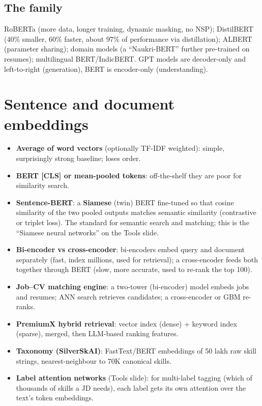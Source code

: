\subsection{The family}
RoBERTa (more data, longer training, dynamic masking, no NSP); DistilBERT (40\% smaller, 60\% faster, about 97\% of performance via distillation);
ALBERT (parameter sharing); domain models (a ``Naukri-BERT'' further pre-trained on resumes); multilingual BERT/IndicBERT. GPT models are decoder-only
and left-to-right (generation), BERT is encoder-only (understanding).

\section{Sentence and document embeddings}
\begin{itemize}
\item \textbf{Average of word vectors} (optionally TF-IDF weighted): simple, surprisingly strong baseline; loses order.
\item \textbf{BERT [CLS] or mean-pooled tokens}: off-the-shelf they are poor for similarity search.
\item \textbf{Sentence-BERT}: a \textbf{Siamese} (twin) BERT fine-tuned so that cosine similarity of the two pooled outputs matches semantic similarity
  (contrastive or triplet loss). The standard for semantic search and matching; this is the ``Siamese neural networks'' on the Tools slide.
\item \textbf{Bi-encoder vs cross-encoder}: bi-encoders embed query and document separately (fast, index millions, used for retrieval); a cross-encoder
  feeds both together through BERT (slow, more accurate, used to re-rank the top 100).
\end{itemize}

\begin{practical}
\begin{itemize}
\item \textbf{Job--CV matching engine}: a two-tower (bi-encoder) model embeds jobs and resumes; ANN search retrieves candidates; a cross-encoder or
  GBM re-ranks.
\item \textbf{PremiumX hybrid retrieval}: vector index (dense) + keyword index (sparse), merged, then LLM-based ranking features.
\item \textbf{Taxonomy (SilverSkAI)}: FastText/BERT embeddings of 50 lakh raw skill strings, nearest-neighbour to 70K canonical skills.
\item \textbf{Label attention networks} (Tools slide): for multi-label tagging (which of thousands of skills a JD needs), each label gets its own attention
  over the text's token embeddings.
\end{itemize}
\end{practical}

